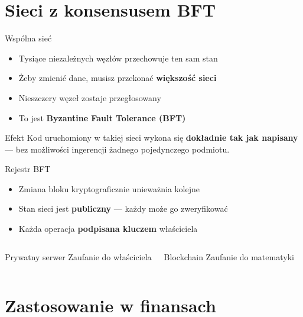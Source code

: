 \section{Sieci z konsensusem BFT}

\begin{frame}{Wspólna sieć}
  \begin{itemize}
    \item Tysiące niezależnych węzłów przechowuje ten sam stan
    \item Żeby zmienić dane, musisz przekonać \textbf{większość sieci}
    \item Nieszczery węzeł zostaje przegłosowany
    \item To jest \textbf{Byzantine Fault Tolerance (BFT)}
  \end{itemize}
  \vspace{0.3cm}
  \begin{exampleblock}{Efekt}
    Kod uruchomiony w takiej sieci wykona się \textbf{dokładnie tak jak napisany} ---
    bez możliwości ingerencji żadnego pojedynczego podmiotu.
  \end{exampleblock}
\end{frame}

\begin{frame}{Rejestr BFT}
  \begin{itemize}
    \item Zmiana bloku kryptograficznie unieważnia kolejne
    \item Stan sieci jest \textbf{publiczny} --- każdy może go zweryfikować
    \item Każda operacja \textbf{podpisana kluczem} właściciela
  \end{itemize}
  \vspace{0.3cm}
  \begin{columns}
      \begin{block}{Prywatny serwer}
        Zaufanie do właściciela
      \end{block}
      \begin{block}{Blockchain}
        Zaufanie do matematyki
      \end{block}
  \end{columns}
\end{frame}

\section{Zastosowanie w finansach}


